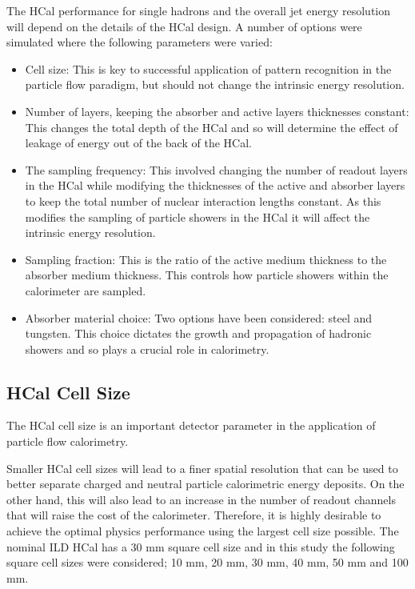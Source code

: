 The HCal performance for single hadrons and the overall jet energy resolution will depend on the details of the HCal design.  A number of options were simulated where the following parameters were varied:
\begin{itemize}
\item Cell size:  This is key to successful application of pattern recognition in the particle flow paradigm, but should not change the intrinsic energy resolution.   
\item Number of layers, keeping the absorber and active layers thicknesses constant:  This changes the total depth of the HCal and so will determine the effect of leakage of energy out of the back of the HCal.
\item The sampling frequency:  This involved changing the number of readout layers in the HCal while modifying the thicknesses of the active and absorber layers to keep the total number of nuclear interaction lengths constant.  As this modifies the sampling of particle showers in the HCal it will affect the intrinsic energy resolution.
\item Sampling fraction:  This is the ratio of the active medium thickness to the absorber medium thickness.  This controls how particle showers within the calorimeter are sampled.
\item Absorber material choice:  Two options have been considered: steel and tungsten.  This choice dictates the growth and propagation of hadronic showers and so plays a crucial role in calorimetry.  
\end{itemize}


\subsection{HCal Cell Size}
\label{sec:hcalcells}
The HCal cell size is an important detector parameter in the application of particle flow calorimetry.  

Smaller HCal cell sizes will lead to a finer spatial resolution that can be used to better separate charged and neutral particle calorimetric energy deposits.  On the other hand, this will also lead to an increase in the number of readout channels that will raise the cost of the calorimeter.  Therefore, it is highly desirable to achieve the optimal physics performance using the largest cell size possible.  The nominal ILD HCal has a 30 mm square cell size and in this study the following square cell sizes were considered; 10 mm, 20 mm, 30 mm, 40 mm, 50 mm and 100 mm.  

